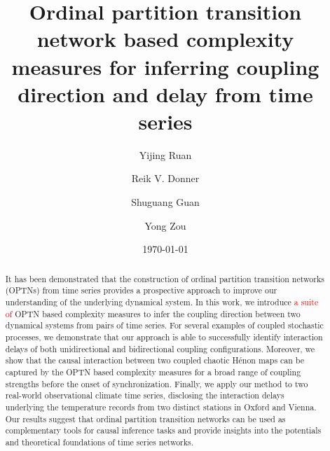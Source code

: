 \documentclass[12pt,aip,cha,reprint,nofootinbib]{revtex4-1}
\begin{document}
\title{Ordinal partition transition network based complexity measures for inferring coupling direction and delay from time series}

\author{Yijing Ruan}

\author{Reik V. Donner}

\author{Shuguang Guan}

\author{Yong Zou}

\date{\today}

\begin{abstract}
It has been demonstrated that the construction of ordinal {\color{red}partition} transition networks (OPTNs) from time series provides a prospective approach to improve our understanding of the underlying dynamical system. In this work, we introduce \textcolor{red}{a suite of} OPTN based complexity measures to infer the coupling direction between two dynamical systems from pairs of time series. For several examples of coupled stochastic processes, we demonstrate that our approach is able to successfully identify interaction delays of both unidirectional and bidirectional coupling configurations. Moreover, we show that the causal interaction between two coupled chaotic H\'enon maps can be captured by the OPTN based complexity measures for a broad range of coupling strengths before the onset of synchronization. Finally, we apply our method to two real-world observational climate time series, disclosing the interaction delays underlying the temperature records from two distinct stations in Oxford and Vienna. Our results suggest that ordinal {\color{red}partition} transition networks can be used as complementary tools for causal inference tasks and provide insights into the potentials and theoretical foundations of time series networks. 
\end{abstract}
\end{document}
